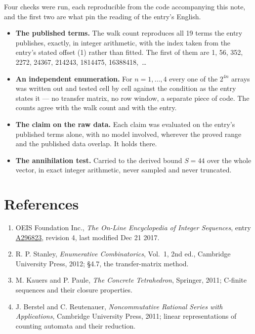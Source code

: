 \documentclass[11pt]{article}
\theoremstyle{definition}
\begin{document}
Four checks were run, each reproducible from the code accompanying this note, and the first two are what pin the reading of the entry's English.

\begin{itemize}

\item {\bfseries The published terms.} The walk count reproduces all 19 terms the entry publishes, exactly, in integer arithmetic, with the index taken from the entry's stated offset (1) rather than fitted. The first of them are 1, 56, 352, 2272, 24367, 214243, 1814475, 16388418,~\dots

\item {\bfseries An independent enumeration.} For $n = 1,\dots,4$ every one of the $2^{4n}$ arrays was written out and tested cell by cell against the condition as the entry states it --- no transfer matrix, no row window, a separate piece of code. The counts agree with the walk count and with the entry.

\item {\bfseries The claim on the raw data.} Each claim was evaluated on the entry's published terms alone, with no model involved, wherever the proved range and the published data overlap. It holds there.

\item {\bfseries The annihilation test.} Carried to the derived bound $S = 44$ over the whole vector, in exact integer arithmetic, never sampled and never truncated.

\end{itemize}

\section{References}

\begin{enumerate}

\item OEIS Foundation Inc., \emph{The On-Line Encyclopedia of Integer Sequences}, entry \href{https://oeis.org/A296823}{A296823}, revision 4, last modified Dec 21 2017.

\item R. P. Stanley, \emph{Enumerative Combinatorics}, Vol.~1, 2nd ed., Cambridge University Press, 2012; \S4.7, the transfer-matrix method.

\item M. Kauers and P. Paule, \emph{The Concrete Tetrahedron}, Springer, 2011; C-finite sequences and their closure properties.

\item J. Berstel and C. Reutenauer, \emph{Noncommutative Rational Series with Applications}, Cambridge University Press, 2011; linear representations of counting automata and their reduction.

\end{enumerate}
\end{document}
